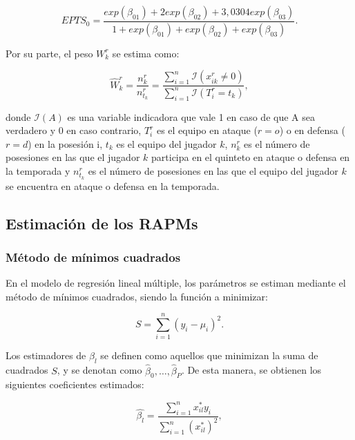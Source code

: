 \documentclass[
  12pt,
]{article}
\begin{document}
\begin{equation}
EPTS_0 =
\frac{
exp(\beta_{01})
+ 2exp(\beta_{02})
+ 3{,}0304exp(\beta_{03})
}{
1
+ exp(\beta_{01})
+ exp(\beta_{02})
+ exp(\beta_{03})
}.
\end{equation}

Por su parte, el peso \(W_k^{r}\) se estima como:

\begin{equation}
\hat{W}_k^{r} =
\frac{n_k^{r}}{n_{t_k}^{r}}
=
\frac{\sum_{i=1}^{n} \mathcal{I}(x_{ik}^{r} \ne 0)}
     {\sum_{i=1}^{n} \mathcal{I}(T_i^{r} = t_k)},
\end{equation}

donde \(\mathcal{I}(A)\) es una variable indicadora que vale 1 en caso
de que A sea verdadero y 0 en caso contrario, \(T_i^r\) es el equipo en
ataque (\(r=o\)) o en defensa (\(r=d\)) en la posesión i, \(t_k\) es el
equipo del jugador \(k\), \(n_k^r\) es el número de posesiones en las
que el jugador \(k\) participa en el quinteto en ataque o defensa en la
temporada y \(n_{t_k}^r\) es el número de posesiones en las que el
equipo del jugador \(k\) se encuentra en ataque o defensa en la
temporada.

\subsection{Estimación de los RAPMs}\label{estimaciuxf3n-de-los-rapms}

\subsubsection{Método de mínimos
cuadrados}\label{muxe9todo-de-muxednimos-cuadrados}

En el modelo de regresión lineal múltiple, los parámetros se estiman
mediante el método de mínimos cuadrados, siendo la función a minimizar:

\begin{equation}
S = \sum_{i=1}^n (y_i-\mu_i)^2.
\end{equation}

Los estimadores de \(\beta_l\) se definen como aquellos que minimizan la
suma de cuadrados \(S\), y se denotan como
\(\hat{\beta}_0, \ldots, \hat{\beta}_P\). De esta manera, se obtienen
los siguientes coeficientes estimados:

\begin{equation}
\hat{\beta_l} = \frac{\sum_{i=1}^n x_{il}^*y_{i}}{\sum_{i=1}^n (x_{il}^*)^2},
\end{equation}
\end{document}
